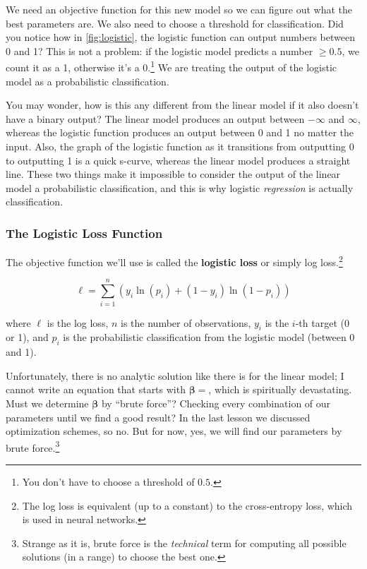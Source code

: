 We need an objective function for this new model so we can figure out what the best parameters are. We also need to choose a threshold for classification. Did you notice how in \autoref{fig:logistic}, the logistic function can output numbers between 0 and 1? This is not a problem: if the logistic model predicts a number $\geq0.5$, we count it as a 1, otherwise it's a 0.\footnote{You don't have to choose a threshold of $0.5$.} We are treating the output of the logistic model as a probabilistic classification.

You may wonder, how is this any different from the linear model if it also doesn't have a binary output? The linear model produces an output between $-\infty$ and $\infty$, whereas the logistic function produces an output between 0 and 1 no matter the input. Also, the graph of the logistic function as it transitions from outputting 0 to outputting 1 is a quick s-curve, whereas the linear model produces a straight line. These two things make it impossible to consider the output of the linear model a probabilistic classification, and this is why logistic \textit{regression} is actually classification.

\subsubsection*{The Logistic Loss Function}
The objective function we'll use is called the \textbf{logistic loss} or simply log loss.\footnote{The log loss is equivalent (up to a constant) to the cross-entropy loss, which is used in neural networks.}

\begin{equation}\label{eq:logloss}
    \ell = \sum_{i=1}^n (y_i \ln(p_i) + (1-y_i)\ln(1-p_i))
\end{equation}

\noindent where $\ell$ is the log loss, $n$ is the number of observations, $y_i$ is the $i$-th target (0 or 1), and $p_i$ is the probabilistic classification from the logistic model (between 0 and 1).

Unfortunately, there is no analytic solution like there is for the linear model; I cannot write an equation that starts with $\boldsymbol{\beta}=$, which is spiritually devastating. Must we determine $\boldsymbol{\beta}$ by ``brute force''? Checking every combination of our parameters until we find a good result? In the last lesson we discussed optimization schemes, so no. But for now, yes, we will find our parameters by brute force.\footnote{Strange as it is, brute force is the \emph{technical} term for computing all possible solutions (in a range) to choose the best one.}


